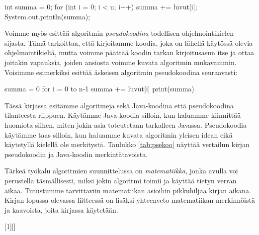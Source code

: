 \begin{code}
int summa = 0;
for (int i = 0; i < n; i++) {
    summa += luvut[i];
}
System.out.println(summa);
\end{code}


Voimme myös esittää algoritmin \emph{pseudokoodina}
todellisen ohjelmointikielen sijasta.
Tämä tarkoittaa, että kirjoitamme koodia,
joka on lähellä käytössä olevia ohjelmointikieliä, mutta voimme
päättää koodin tarkan kirjoitusasun itse ja ottaa joitakin vapauksia,
joiden ansiosta voimme kuvata algoritmin mukavammin.
Voisimme esimerkiksi esittää äskeisen algoritmin pseudokoodina seuraavasti:

\begin{code}
summa = 0
for i = 0 to n-1
    summa += luvut[i]
print(summa)
\end{code}

Tässä kirjassa esitämme algoritmeja sekä Java-koodina että pseudokoodina
tilanteesta riippuen.
Käytämme Java-koodia silloin, kun haluamme kiinnittää huomiota siihen,
miten jokin asia toteutetaan tarkalleen Javassa.
Pseudokoodia käytämme taas silloin, kun haluamme kuvata algoritmin yleisen
idean eikä käytetyllä kielellä ole merkitystä.
Taulukko \ref{tab:psekoo} näyttää vertailun kirjan pseudokoodin
ja Java-koodin merkintätavoista.

Tärkeä työkalu algoritmien suunnittelussa on \emph{matematiikka},
jonka avulla voi perustella täsmällisesti,
miksi jokin algoritmi toimii ja käyttää tietyn verran aikaa.
Tutustumme tarvittaviin matematiikan asioihin pikkuhiljaa kirjan aikana.
Kirjan lopussa olevassa liitteessä on lisäksi yhteenveto matematiikan
merkinnöistä ja kaavoista, joita kirjassa käytetään.

[1][]%
{
   \noindent
   \small
   \vspace{0.5\baselineskip}
   \lstset{#1,xleftmargin=0pt}}
{\endminipage}

